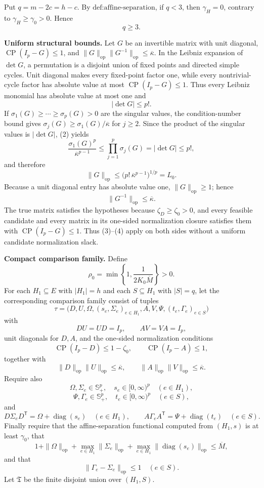 Put \(q=m-2c=h-c\). By \(\text{def:affine-separation}\), if \(q<3\), then \(\gamma_H=0\), contrary to \(\gamma_H\geq\gamma_0>0\). Hence
\[
q\geq3.
\tag{1}
\]

\textbf{Uniform structural bounds.}
Let \(G\) be an invertible matrix with unit diagonal, \(\operatorname{CP}(I_p-G)\leq1\), and
\(\|G\|_{\mathrm{op}}\|G^{-1}\|_{\mathrm{op}}\leq\overline\kappa\). In the Leibniz expansion of \(\det G\), a permutation is a disjoint union of fixed points and directed simple cycles. Unit diagonal makes every fixed-point factor one, while every nontrivial-cycle factor has absolute value at most \(\operatorname{CP}(I_p-G)\leq1\). Thus every Leibniz monomial has absolute value at most one and
\[
|\det G|\leq p!.
\tag{2}
\]
If \(\sigma_1(G)\geq\cdots\geq\sigma_p(G)>0\) are the singular values, the condition-number bound gives \(\sigma_j(G)\geq\sigma_1(G)/\overline\kappa\) for \(j\geq2\). Since the product of the singular values is \(|\det G|\), (2) yields
\[
\frac{\sigma_1(G)^p}{\overline\kappa^{p-1}}
\leq\prod_{j=1}^p\sigma_j(G)
=|\det G|
\leq p!,
\]
and therefore
\[
\|G\|_{\mathrm{op}}
\leq\bigl(p!\,\overline\kappa^{p-1}\bigr)^{1/p}
=L_0.
\tag{3}
\]
Because a unit diagonal entry has absolute value one, \(\|G\|_{\mathrm{op}}\geq1\); hence
\[
\|G^{-1}\|_{\mathrm{op}}\leq\overline\kappa.
\tag{4}
\]
The true matrix satisfies the hypotheses because \(\zeta_D\geq\zeta_0>0\), and every feasible candidate and every matrix in its one-sided normalization closure satisfies them with \(\operatorname{CP}(I_p-G)\leq1\). Thus (3)--(4) apply on both sides without a uniform candidate normalization slack.

\textbf{Compact comparison family.}
Define
\[
\rho_0=\min\left\{1,\frac{1}{2K_0\overline M}\right\}>0.
\tag{5}
\]
For each \(H_1\subseteq E\) with \(|H_1|=h\) and each \(S\subseteq H_1\) with \(|S|=q\), let the corresponding comparison family consist of tuples
\[
\tau=\bigl(D,U,\Omega,(s_e,\Sigma_e)_{e\in H_1},
A,V,\Psi,(t_e,\Gamma_e)_{e\in S}\bigr)
\tag{6}
\]
with
\[
DU=UD=I_p,
\qquad AV=VA=I_p,
\tag{7}
\]
unit diagonals for \(D,A\), and the one-sided normalization conditions
\[
\operatorname{CP}(I_p-D)\leq1-\zeta_0,
\qquad
\operatorname{CP}(I_p-A)\leq1,
\tag{8}
\]
together with
\[
\|D\|_{\mathrm{op}}\|U\|_{\mathrm{op}}\leq\overline\kappa,
\qquad
\|A\|_{\mathrm{op}}\|V\|_{\mathrm{op}}\leq\overline\kappa.
\tag{9}
\]
Require also
\[
\Omega,\Sigma_e\in\mathbb S_+^p,\quad s_e\in[0,\infty)^p
\quad(e\in H_1),
\]
\[
\Psi,\Gamma_e\in\mathbb S_+^p,\quad t_e\in[0,\infty)^p
\quad(e\in S),
\tag{10}
\]
and
\[
D\Sigma_eD^{\mathsf T}=\Omega+\operatorname{diag}(s_e)
\quad(e\in H_1),
\qquad
A\Gamma_eA^{\mathsf T}=\Psi+\operatorname{diag}(t_e)
\quad(e\in S).
\tag{11}
\]
Finally require that the affine-separation functional computed from \((H_1,s)\) is at least \(\gamma_0\), that
\[
1+\|\Omega\|_{\mathrm{op}}
+\max_{e\in H_1}\|\Sigma_e\|_{\mathrm{op}}
+\max_{e\in H_1}\|\operatorname{diag}(s_e)\|_{\mathrm{op}}
\leq\overline M,
\tag{12}
\]
and that
\[
\|\Gamma_e-\Sigma_e\|_{\mathrm{op}}\leq1
\quad(e\in S).
\tag{13}
\]
Let \(\mathfrak T\) be the finite disjoint union over \((H_1,S)\).


